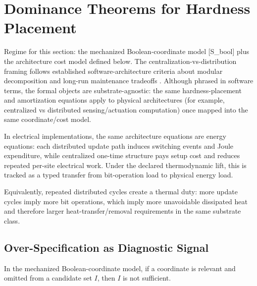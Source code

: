 \section{Dominance Theorems for Hardness Placement}\label{sec:implications}

Regime for this section: the mechanized Boolean-coordinate model [S\_bool] plus the architecture cost model defined below. The centralization-vs-distribution framing follows established software-architecture criteria about modular decomposition and long-run maintenance tradeoffs \cite{parnas1972criteria, brooks1987no, bass2012software, shaw1996software}.
Although phrased in software terms, the formal objects are substrate-agnostic: the same hardness-placement and amortization equations apply to physical architectures (for example, centralized vs distributed sensing/actuation computation) once mapped into the same coordinate/cost model.

In electrical implementations, the same architecture equations are energy equations: each distributed update path induces switching events and Joule expenditure, while centralized one-time structure pays setup cost and reduces repeated per-site electrical work. Under the declared thermodynamic lift, this is tracked as a typed transfer from bit-operation load to physical energy load.

Equivalently, repeated distributed cycles create a thermal duty: more update cycles imply more bit operations, which imply more unavoidable dissipated heat and therefore larger heat-transfer/removal requirements in the same substrate class.

\subsection{Over-Specification as Diagnostic Signal}

\begin{corollary}\label{cor:overmodel-diagnostic-implication}
In the mechanized Boolean-coordinate model, if a coordinate is relevant and omitted from a candidate set $I$, then $I$ is not sufficient.
\end{corollary}

